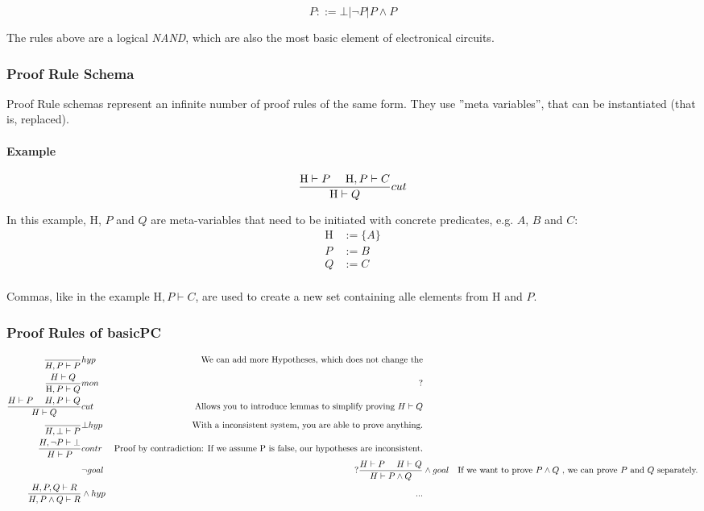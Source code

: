 \[
	P ::= \bot | \neg P | P \land P
\]

The rules above are a logical \emph{NAND}, which are also the most basic element of electronical circuits.

\subsubsection{Proof Rule Schema}

Proof Rule schemas represent an infinite number of proof rules of the same form. They use ''meta variables'', that can be instantiated (that is, replaced).

\paragraph{Example} 
\[
	\frac{
		\text{H} \vdash P \text{ }\text{ }\text{ }\text{ } \text{H}, P \vdash C
	 }{
		\text{H} \vdash Q
	} cut
\]

In this example, H, $P$ and $Q$ are meta-variables that need to be initiated with concrete predicates, e.g. $A$, $B$ and $C$: \begin{align*}
  \text{H} &:= \{A\} \\
	P &:= B \\
	Q &:= C \\
\end{align*}

Commas, like in the example $\text{H}, P \vdash C$, are used to create a new set containing alle elements from H and $P$.

\subsubsection{Proof Rules of basicPC}

\begin{align*}
	  \frac{}{H,P \vdash P}
	& hyp
	& \text{We can add more Hypotheses, which does not change the} \\
		\frac{H \vdash Q}{\text{H},P \vdash Q}
	& mon
	& \text{?} \\
	  \frac{H \vdash P \mathSpaceSeparator H, P \vdash Q}{H \vdash Q}
	& cut
	& \text{Allows you to introduce lemmas to simplify proving } H \vdash Q \\
	\frac{}{H, \bot \vdash P}
	& \bot hyp
	& \text{With a inconsistent system, you are able to prove anything.} \\
	\frac{H, \neg P \vdash \bot}{H \vdash P}
	& contr
	& \text{Proof by contradiction: If we assume P is false, our hypotheses are inconsistent.} \\
	& \neg goal
	& \text{?}
	\frac{H \vdash P \mathSpaceSeparator H \vdash Q}{H \vdash P \land Q}
	& \land goal
	& \text{If we want to prove } P \land Q \text{ , we can prove } P \text{ and } Q \text{ separately.} \\ %
	\frac{H,P,Q \vdash R}{H,P \land Q \vdash R}
	& \land hyp
	&	\text{...} %
\end{align*}

